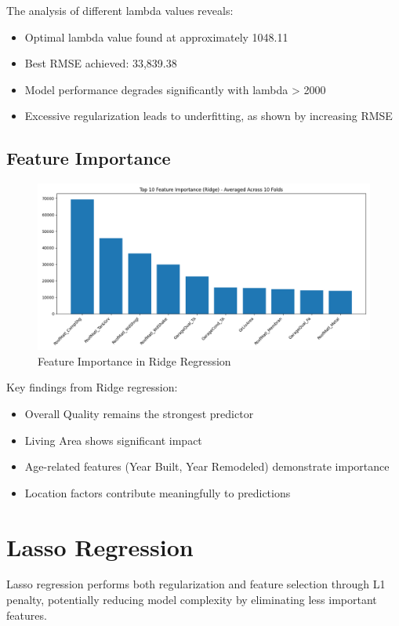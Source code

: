 The analysis of different lambda values reveals:
\begin{itemize}
    \item Optimal lambda value found at approximately 1048.11
    \item Best RMSE achieved: 33,839.38
    \item Model performance degrades significantly with lambda > 2000
    \item Excessive regularization leads to underfitting, as shown by increasing RMSE
\end{itemize}

\subsection{Feature Importance}
\begin{figure}[H]
    \centering
    \includegraphics[width=1.0\textwidth]{../ridge_feature_importance.png}
    \caption{Feature Importance in Ridge Regression}
    \label{fig:ridge_importance}
\end{figure}

Key findings from Ridge regression:
\begin{itemize}
    \item Overall Quality remains the strongest predictor
    \item Living Area shows significant impact
    \item Age-related features (Year Built, Year Remodeled) demonstrate importance
    \item Location factors contribute meaningfully to predictions
\end{itemize}

\section{Lasso Regression}
Lasso regression performs both regularization and feature selection through L1 penalty, potentially reducing model complexity by eliminating less important features.

